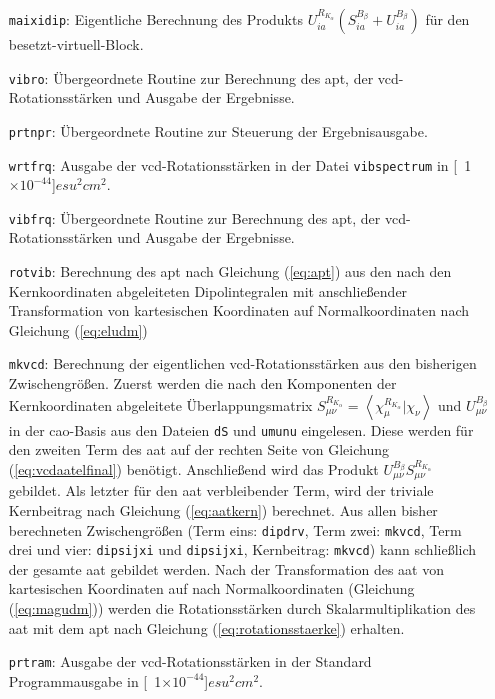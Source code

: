 \begin{itemize}
	\item[\texttt{maixidip}:] Eigentliche Berechnung des Produkts $U_{ia}^{R_{K_\alpha}}\left(S_{ia}^{B_\beta}+U_{ia}^{B_\beta}\right)$ für den besetzt-virtuell-Block.
	\item[\texttt{vibro}:] Übergeordnete Routine zur Berechnung des \ac{apt}, der \ac{vcd}-Rotationsstärken und Ausgabe der Ergebnisse.
	\item[\texttt{prtnpr}:] Übergeordnete Routine zur Steuerung der Ergebnisausgabe. 
	\item[\texttt{wrtfrq}:] Ausgabe der \ac{vcd}-Rotationsstärken in der Datei \texttt{vibspectrum} in \unit[1$\times 10^{-44}$]{$esu^2cm^2$}.
	\item[\texttt{vibfrq}:] Übergeordnete Routine zur Berechnung des \ac{apt}, der \ac{vcd}-Rotationsstärken und Ausgabe der Ergebnisse.
	\item[\texttt{rotvib}:] Berechnung des \ac{apt} nach Gleichung (\ref{eq:apt}) aus den nach den Kernkoordinaten abgeleiteten Dipolintegralen mit anschließender Transformation von kartesischen Koordinaten auf Normalkoordinaten nach Gleichung (\ref{eq:eludm})
	\item[\texttt{mkvcd}:] Berechnung der eigentlichen \ac{vcd}-Rotationsstärken aus den bisherigen Zwischengrößen. Zuerst werden die nach den Komponenten der Kernkoordinaten abgeleitete Überlappungsmatrix $S_{\mu\nu}^{R_{K_\alpha}}=\left\langle\chi_\mu^{R_{K_\alpha}}\vert\chi_\nu\right\rangle$ und $U_{\mu\nu}^{B_\beta}$ in der \ac{cao}-Basis aus den Dateien \texttt{dS} und \texttt{umunu} eingelesen. Diese werden für den zweiten Term des \ac{aat} auf der rechten Seite von Gleichung (\ref{eq:vcdaatelfinal}) benötigt. Anschließend wird das Produkt $U_{\mu\nu}^{B_\beta}S_{\mu\nu}^{R_{K_\alpha}}$ gebildet. Als letzter für den \ac{aat} verbleibender Term, wird der triviale Kernbeitrag nach Gleichung (\ref{eq:aatkern}) berechnet. Aus allen bisher berechneten Zwischengrößen (Term eins: \texttt{dipdrv}, Term zwei: \texttt{mkvcd}, Term drei und vier: \texttt{dipsijxi} und \texttt{dipsijxi}, Kernbeitrag: \texttt{mkvcd}) kann schließlich der gesamte \ac{aat} gebildet werden. Nach der Transformation des \ac{aat} von kartesischen Koordinaten auf nach Normalkoordinaten (Gleichung (\ref{eq:magudm})) werden die Rotationsstärken durch Skalarmultiplikation des \ac{aat} mit dem \ac{apt} nach Gleichung (\ref{eq:rotationsstaerke}) erhalten.  
	\item[\texttt{prtram}:] Ausgabe der \ac{vcd}-Rotationsstärken in der Standard Programmausgabe in \unit[1$\times 10^{-44}$]{$esu^2cm^2$}.
\end{itemize}
	
